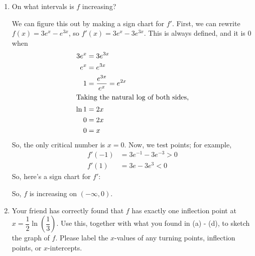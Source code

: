 \documentclass{article}
\theoremstyle{theorem}
\begin{document}
\begin{enumerate}
\begin{enumerate}
  \item 
    \begin{problem}[\stretch{3}]
      On what intervals is $f$ increasing?  
    \end{problem}

    \begin{solution}
      We can figure this out by making a sign chart for $f'$. First, we can rewrite $f(x) = 3 e^x - e^{3x}$, so $f'(x) = 3 e^x - 3 e^{3x}$. This is always defined, and it is 0 when
      \begin{align*}
        3 e^x &= 3 e^{3x} \\
        e^x &= e^{3x} \\
        1 &= \frac{e^{3x}}{e^x} = e^{2x} \\
        \intertext{Taking the natural log of both sides,}
        \ln 1 &= 2x \\
        0 &= 2x \\
        0 &= x
      \end{align*}
      So, the only critical number is $x = 0$. Now, we test points; for example,
      \begin{align*}
        f'(-1) &= 3 e^{-1} - 3 e^{-3} > 0 \\
        f'(1) &= 3 e - 3e^3 < 0 
      \end{align*}
      So, here's a sign chart for $f'$:
      \begin{center}
      \end{center}
      So, $f$ is increasing on $\boxed{(-\infty, 0)}$. 
    \end{solution}

  \item 
    \begin{problem}[\vfill\newpage]
      Your friend has correctly found that $f$ has exactly one inflection point at $x = \dfrac{1}{2} \ln \left( \dfrac{1}{3} \right)$. Use this, together with what you found in (a) - (d), to sketch the graph of $f$. Please label the $x$-values of any turning points, inflection points, or $x$-intercepts. 
    \end{problem}


\end{enumerate}
\end{enumerate}
\end{document}
